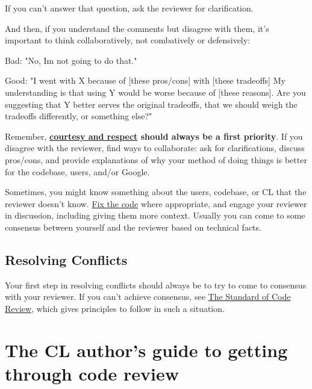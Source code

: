\documentclass[
]{article}
\newenvironment{Shaded}{}{}
\newcommand{\NormalTok}[1]{#1}
\begin{document}
If you can't answer that question, ask the reviewer for clarification.

And then, if you understand the comments but disagree with them, it's
important to think collaboratively, not combatively or defensively:

\begin{Shaded}
\begin{Highlighting}[]
\NormalTok{Bad: "No, I\textquotesingle{}m not going to do that."}
\end{Highlighting}
\end{Shaded}

\begin{Shaded}
\begin{Highlighting}[]
\NormalTok{Good: "I went with X because of [these pros/cons] with [these tradeoffs]}
\NormalTok{My understanding is that using Y would be worse because of [these reasons].}
\NormalTok{Are you suggesting that Y better serves the original tradeoffs, that we should}
\NormalTok{weigh the tradeoffs differently, or something else?"}
\end{Highlighting}
\end{Shaded}

Remember,
\textbf{\href{https://chromium.googlesource.com/chromium/src/+/master/docs/cr_respect.md}{courtesy
and respect} should always be a first priority}. If you disagree with
the reviewer, find ways to collaborate: ask for clarifications, discuss
pros/cons, and provide explanations of why your method of doing things
is better for the codebase, users, and/or Google.

Sometimes, you might know something about the users, codebase, or CL
that the reviewer doesn't know. \hyperref[code]{Fix the code} where
appropriate, and engage your reviewer in discussion, including giving
them more context. Usually you can come to some consensus between
yourself and the reviewer based on technical facts.

\subsection{Resolving Conflicts}\label{conflicts}

Your first step in resolving conflicts should always be to try to come
to consensus with your reviewer. If you can't achieve consensus, see
\href{../reviewer/standard.md}{The Standard of Code Review}, which gives
principles to follow in such a situation.

\section{The CL author's guide to getting through code
review}\label{the-cl-authors-guide-to-getting-through-code-review}
\end{document}
